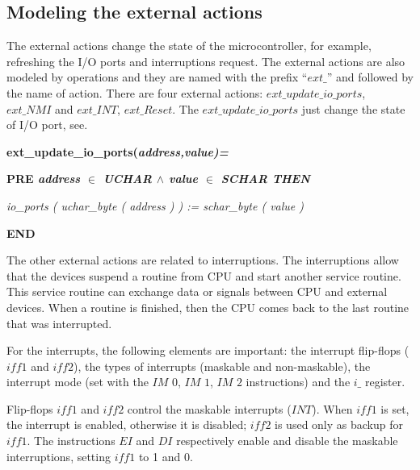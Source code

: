 \documentclass[a4paper]{llncs}
\begin{document}
\subsection{Modeling the external actions}
\label{sec:externalactions}

The external actions change the state of the microcontroller, for example, refreshing the I/O ports
and interruptions request. The external actions are also modeled by operations and they are named with the
prefix ``$ext\_$'' and followed by the name of action. There are four external
actions: $ext\_update\_io\_ports$, $ext\_NMI$ and $ext\_INT$, $ext\_Reset$. The
$ext\_update\_io\_ports$ just change the state of I/O port, see.

\hspace*{0.20in}\bf ext\_update\_io\_ports\rm (\it address\rm ,\it value\rm )\rm =

\hspace*{0.20in}\bf PRE \it address  $\in$  \it UCHAR  $\land$ \hspace*{0.10in}\it value  $\in$  \it SCHAR \bf THEN

\hspace*{0.40in}\it io\_ports \rm ( \it uchar\_byte \rm ( \it address \rm ) \rm ) \rm := \it schar\_byte \rm ( \it
value \rm )

\hspace*{0.20in}\bf END\rm 

The other external actions are related to interruptions. The interruptions allow
that the devices suspend a routine from CPU and start another service routine.
This service routine can exchange data or signals between CPU and external
devices. When a routine is finished, then the CPU comes back to the last routine
that was interrupted.

For the interrupts, the following elements are important:  the interrupt flip-flops
($\textit{iff1}$ and $\textit{iff2}$), the types of interrupts (maskable and
non-maskable), the interrupt mode (set with the $\textit{IM 0}$, $\textit{IM 1}$,
$\textit{IM 2}$ instructions) and the $\textit{i\_}$ register.

Flip-flops $\textit{iff1}$ and $\textit{iff2}$ control the maskable interrupts
($\textit{INT}$). When $\textit{iff1}$ is set, the interrupt is enabled,
otherwise it is disabled; $\textit{iff2}$ is used only as backup for $\textit{iff1}$. The
instructions $\textit{EI}$ and $\textit{DI}$ respectively enable and disable the
maskable interruptions, setting  $\textit{iff1}$ to 1 and 0.
\end{document}
